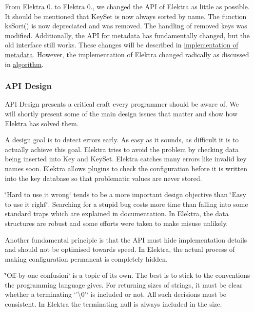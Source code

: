 From Elektra 0. to Elektra 0., we changed the A\+P\+I of Elektra as little as possible. It should be mentioned that {\ttfamily Key\+Set} is now always sorted by name. The function {\ttfamily ks\+Sort()} is now depreciated and was removed. The handling of removed keys was modified. Additionally, the A\+P\+I for metadata has fundamentally changed, but the old interface still works. These changes will be described in \hyperlink{md_doc_help_elektra-metadata_doc_help_elektra-metadata_md}{implementation of metadata}. However, the implementation of Elektra changed radically as discussed in \hyperlink{md_doc_help_elektra-algorithm_doc_help_elektra-algorithm_md}{algorithm}.

\subsubsection*{A\+P\+I Design}

A\+P\+I Design presents a critical craft every programmer should be aware of. We will shortly present some of the main design issues that matter and show how Elektra has solved them.

A design goal is to detect errors early. As easy as it sounds, as difficult it is to actually achieve this goal. Elektra tries to avoid the problem by checking data being inserted into {\ttfamily Key} and {\ttfamily Key\+Set}. Elektra catches many errors like invalid key names soon. Elektra allows plugins to check the configuration before it is written into the key database so that problematic values are never stored.

\char`\"{}\+Hard to use it wrong\char`\"{} tends to be a more important design objective than \char`\"{}\+Easy to use it right\char`\"{}. Searching for a stupid bug costs more time than falling into some standard traps which are explained in documentation. In Elektra, the data structures are robust and some efforts were taken to make misuse unlikely.

Another fundamental principle is that the A\+P\+I must hide implementation details and should not be optimised towards speed. In Elektra, the actual process of making configuration permanent is completely hidden.

\char`\"{}\+Off-\/by-\/one confusion\char`\"{} is a topic of its own. The best is to stick to the conventions the programming language gives. For returning sizes of strings, it must be clear whether a terminating `'\textbackslash{}0'` is included or not. All such decisions must be consistent. In Elektra the terminating null is always included in the size.

